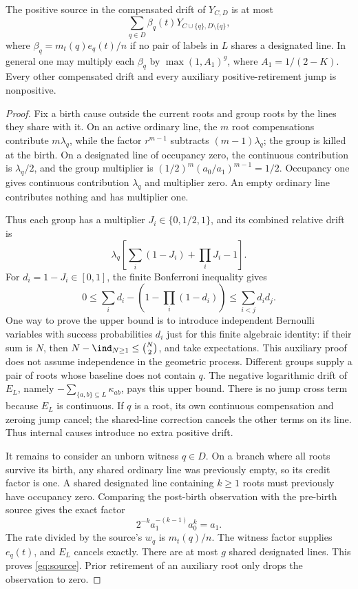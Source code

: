 \begin{lemma}\label{lem:source}
The positive source in the compensated drift of \(Y_{C,D}\) is at
most
\begin{equation}\label{eq:source}
 \sum_{q\in D}\beta_q(t)Y_{C\cup\{q\},D\setminus\{q\}},
\end{equation}
where \(\beta_q=m_t(q)e_q(t)/n\) if no pair of labels in \(L\) shares
a designated line. In general one may multiply each \(\beta_q\) by
\(\max(1,A_1)^g\), where \(A_1=1/(2-K)\).
Every other compensated drift and every auxiliary positive-retirement
jump is nonpositive.
\end{lemma}
\begin{proof}
Fix a birth cause outside the current roots and group roots by the
lines they share with it. On an active ordinary line, the \(m\) root
compensations contribute \(m\lambda_q\), while the factor
\(r^{m-1}\) subtracts \((m-1)\lambda_q\); the group is killed at the
birth. On a designated line of occupancy zero, the continuous
contribution is \(\lambda_q/2\), and the group multiplier is
\((1/2)^m(a_0/a_1)^{m-1}=1/2\). Occupancy one gives continuous
contribution \(\lambda_q\) and multiplier zero. An empty ordinary
line contributes nothing and has multiplier one.

Thus each group has a multiplier \(J_i\in\{0,1/2,1\}\), and its
combined relative drift is
\[
 \lambda_q\left[\sum_i(1-J_i)+\prod_iJ_i-1\right].
\]
For \(d_i=1-J_i\in[0,1]\), the finite Bonferroni inequality gives
\[
 0\le\sum_i d_i-\left(1-\prod_i(1-d_i)\right)
 \le\sum_{i<j}d_i d_j.
\]
One way to prove the upper bound is to introduce independent Bernoulli
variables with success probabilities \(d_i\) just for this finite
algebraic identity: if their sum is \(N\), then
\(N-\ind_{N\ge1}\le\binom N2\), and take expectations.
This auxiliary proof does not assume independence in the geometric
process. Different groups supply a pair of roots whose baseline does
not contain \(q\). The negative logarithmic drift of \(E_L\), namely
\(-\sum_{\{a,b\}\subseteq L}\kappa_{ab}\), pays this upper bound.
There is no jump cross term because \(E_L\) is continuous.
If \(q\) is a root, its own continuous compensation and zeroing jump
cancel; the shared-line correction cancels the other terms on its
line. Thus internal causes introduce no extra positive drift.

It remains to consider an unborn witness \(q\in D\). On a branch
where all roots survive its birth, any shared ordinary line was
previously empty, so its credit factor is one. A shared designated
line containing \(k\ge1\) roots must previously have occupancy zero.
Comparing the post-birth observation with the pre-birth source gives
the exact factor
\[
 2^{-k}a_1^{-(k-1)}a_0^k=a_1.
\]
The rate divided by the source's \(w_q\) is \(m_t(q)/n\).
The witness factor supplies \(e_q(t)\), and \(E_L\) cancels exactly.
There are at most \(g\) shared designated lines. This proves
\eqref{eq:source}. Prior retirement of an auxiliary root only drops
the observation to zero.
\end{proof}


